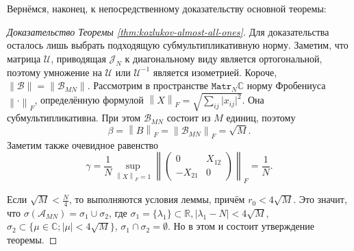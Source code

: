 Вернёмся, наконец, к непосредственному доказательству основной теоремы:
\begin{proof}[Доказательство Теоремы \ref{thm:kozlukov-almost-all-ones}]
    Для доказательства осталось лишь выбрать подходящую субмультипликативную норму.
    Заметим, что матрица \( \mathcal{U} \),
    приводящая \( \mathcal{J}_N \) к диагональному виду
    является ортогональной,
    поэтому умножение на \( \mathcal{U} \) или \(\mathcal{U}^{-1}\)
    является изометрией.
    Короче, \( \|\mathcal{B}\|=\|\mathscr{B}_{MN}\| \).
    Рассмотрим в пространстве \( \mathtt{Matr}_{N}\mathbb{C} \)
    норму Фробениуса \( {\left\|\cdot\right\|}_{F} \),
    определённую формулой
    \( {\left\|X\right\|}_{F} = \sqrt{\sum_{ij} \lvert x_{ij}\rvert^2}. \)
    Она субмультипликативна.
    При этом
    \( \mathscr{B}_{MN} \) состоит из \( M \) единиц, поэтому
    \[
        \beta = {\left\|B\right\|}_{F} =
        {\left\|\mathscr{B}_{MN}\right\|}_{F} = \sqrt{M}.
        \]
    Заметим также очевидное равенство
    \[
        \gamma = \frac1N
                \sup_{{\left\|X\right\|}_{F}=1}{\left\|\begin{pmatrix}0 & X_{12} \\ -X_{21} & 0\end{pmatrix}\right\|}_{F}
                = \frac1N. \]
    
    Если
     \( \sqrt{M} < \frac{N}{4} \),
     то выполняются условия леммы,
     причём \( r_0 < 4\sqrt{M} \).
    Это значит, что
     \( \sigma(\mathscr{A}_{MN}) = \sigma_1 \cup \sigma_2 \),
     где \( \sigma_1 = \{ \lambda_1 \}\subset\mathbb{R}, \lvert \lambda_1 - N \rvert < 4\sqrt{M} \),
     \( \sigma_2 \subset \{ \mu\in\mathbb{C}; \lvert\mu\rvert < 4\sqrt{M} \} \),
     \( \sigma_1 \cap \sigma_2 = \emptyset \).
    Но в этом и состоит утверждение теоремы.
    \end{proof}
